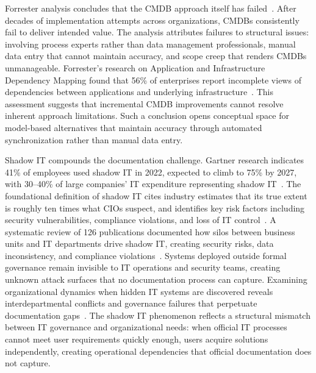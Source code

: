 Forrester analysis concludes that the CMDB approach itself has failed~\parencite{Forrester_CMDB_Dead_2025}. After decades of implementation attempts across organizations, CMDBs consistently fail to deliver intended value. The analysis attributes failures to structural issues: involving process experts rather than data management professionals, manual data entry that cannot maintain accuracy, and scope creep that renders CMDBs unmanageable. Forrester's research on Application and Infrastructure Dependency Mapping found that 56\% of enterprises report incomplete views of dependencies between applications and underlying infrastructure~\parencite{Forrester_AIDM_2018}. This assessment suggests that incremental CMDB improvements cannot resolve inherent approach limitations. Such a conclusion opens conceptual space for model-based alternatives that maintain accuracy through automated synchronization rather than manual data entry.

Shadow IT compounds the documentation challenge. Gartner research indicates 41\% of employees used shadow IT in 2022, expected to climb to 75\% by 2027, with 30--40\% of large companies' IT expenditure representing shadow IT~\parencite{Gartner_Shadow_IT_2022}. The foundational definition of shadow IT cites industry estimates that its true extent is roughly ten times what CIOs suspect, and identifies key risk factors including security vulnerabilities, compliance violations, and loss of IT control~\parencite{Haag_Eckhardt_2017}.
A systematic review of 126 publications documented how silos between business units and IT departments drive shadow IT, creating security risks, data inconsistency, and compliance violations~\parencite{Klotz_2019}. Systems deployed outside formal governance remain invisible to IT operations and security teams, creating unknown attack surfaces that no documentation process can capture. Examining organizational dynamics when hidden IT systems are discovered reveals interdepartmental conflicts and governance failures that perpetuate documentation gaps~\parencite{Furstenau_2021}. The shadow IT phenomenon reflects a structural mismatch between IT governance and organizational needs: when official IT processes cannot meet user requirements quickly enough, users acquire solutions independently, creating operational dependencies that official documentation does not capture.

